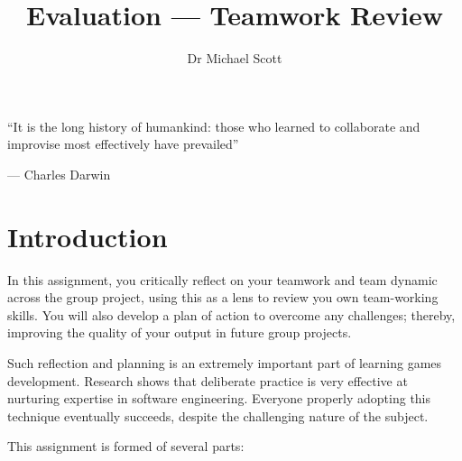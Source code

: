 \documentclass{../fal_assignment}
\title{Evaluation --- Teamwork Review}
\author{Dr Michael Scott}
\begin{document}
\maketitle
\begin{marginquote}
    ``It is the long history of humankind: those who learned to collaborate and improvise most effectively have prevailed''
    
    --- Charles Darwin
\end{marginquote}
\section*{Introduction}

In this assignment, you critically reflect on your teamwork and team dynamic across the group project, using this as a lens to review you own team-working skills. You will also develop a plan of action to overcome any challenges; thereby, improving the quality of your output in future group projects.

Such reflection and planning is an extremely important part of learning games development. Research shows that deliberate practice is very effective at nurturing expertise in software engineering. Everyone properly adopting this technique eventually succeeds, despite the challenging nature of the subject.

This assignment is formed of several parts:
\end{document}

